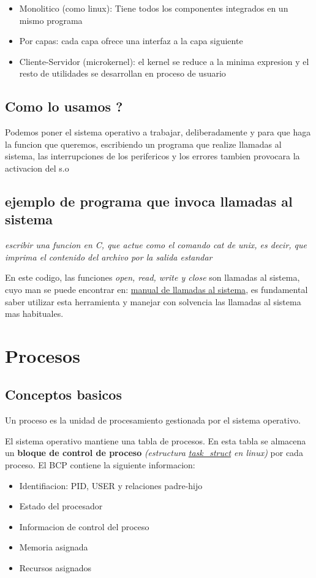 \documentclass[12pt, letterpaper]{article}
\begin{document}
\begin{itemize}
	\item{Monolitico (como linux): Tiene todos los componentes integrados en un mismo programa}
	\item{Por capas: cada capa ofrece una interfaz a la capa siguiente}
	\item{Cliente-Servidor (microkernel): el kernel se reduce a la minima expresion y el resto de utilidades se desarrollan en proceso de usuario}
\end{itemize}

\subsection{Como lo usamos ?}

Podemos poner el sistema operativo a trabajar, deliberadamente y para que haga la funcion que queremos, escribiendo un programa que realize llamadas al sistema, las interrupciones de los perifericos y los errores tambien provocara la activacion del s.o

\subsection{ejemplo de programa que invoca llamadas al sistema}
\textit{escribir una funcion en C, que actue como el comando cat de unix, es decir, que imprima el contenido del archivo por la salida estandar}



En este codigo, las funciones \textit{open, read, write y close} son llamadas al sistema, cuyo man se puede encontrar en: \href{http://man7.org/linux/man-pages/man2/}{manual de llamadas al sistema}, es fundamental saber utilizar esta herramienta y manejar con solvencia las llamadas al sistema mas habituales.

\section{Procesos}

\subsection{Conceptos basicos}
Un proceso es la unidad de procesamiento gestionada por el sistema operativo.\par
El sistema operativo mantiene una tabla de procesos. En esta tabla se almacena un \textbf{bloque de control de proceso} \textit{(estructura \href{https://github.com/torvalds/linux/blob/master/include/linux/sched.h}{task\_struct} en linux)} por cada proceso.
El BCP contiene la siguiente informacion:
\begin{itemize}
	\item{Identifiacion: PID, USER y relaciones padre-hijo}
	\item{Estado del procesador}
	\item{Informacion de control del proceso}
	\item{Memoria asignada}
	\item{Recursos asignados}
\end{itemize}
\end{document}

